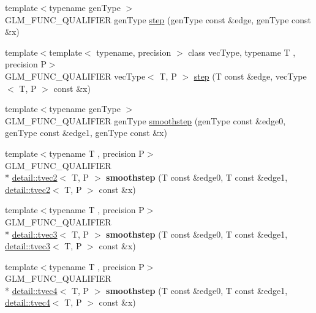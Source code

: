 \begin{DoxyCompactItemize}
\item 
{\footnotesize template$<$typename gen\-Type $>$ }\\G\-L\-M\-\_\-\-F\-U\-N\-C\-\_\-\-Q\-U\-A\-L\-I\-F\-I\-E\-R gen\-Type \hyperlink{group__core__func__common_gaf21c84759af7799f573865f70c2f0a86}{step} (gen\-Type const \&edge, gen\-Type const \&x)
\item 
{\footnotesize template$<$template$<$ typename, precision $>$ class vec\-Type, typename T , precision P$>$ }\\G\-L\-M\-\_\-\-F\-U\-N\-C\-\_\-\-Q\-U\-A\-L\-I\-F\-I\-E\-R vec\-Type$<$ T, P $>$ \hyperlink{group__core__func__common_gae830a682901c0ba63c92a7d201bba007}{step} (T const \&edge, vec\-Type$<$ T, P $>$ const \&x)
\item 
{\footnotesize template$<$typename gen\-Type $>$ }\\G\-L\-M\-\_\-\-F\-U\-N\-C\-\_\-\-Q\-U\-A\-L\-I\-F\-I\-E\-R gen\-Type \hyperlink{group__core__func__common_ga754103c8d2cdaf40f71429252457c10a}{smoothstep} (gen\-Type const \&edge0, gen\-Type const \&edge1, gen\-Type const \&x)
\item 
\hypertarget{namespaceglm_a87db22e4254b9f56eaafefb7cfb72a13}{{\footnotesize template$<$typename T , precision P$>$ }\\G\-L\-M\-\_\-\-F\-U\-N\-C\-\_\-\-Q\-U\-A\-L\-I\-F\-I\-E\-R \\*
\hyperlink{structglm_1_1detail_1_1tvec2}{detail\-::tvec2}$<$ T, P $>$ {\bfseries smoothstep} (T const \&edge0, T const \&edge1, \hyperlink{structglm_1_1detail_1_1tvec2}{detail\-::tvec2}$<$ T, P $>$ const \&x)}\label{namespaceglm_a87db22e4254b9f56eaafefb7cfb72a13}

\item 
\hypertarget{namespaceglm_a70ce610b837517f7cf8a82316b2b662c}{{\footnotesize template$<$typename T , precision P$>$ }\\G\-L\-M\-\_\-\-F\-U\-N\-C\-\_\-\-Q\-U\-A\-L\-I\-F\-I\-E\-R \\*
\hyperlink{structglm_1_1detail_1_1tvec3}{detail\-::tvec3}$<$ T, P $>$ {\bfseries smoothstep} (T const \&edge0, T const \&edge1, \hyperlink{structglm_1_1detail_1_1tvec3}{detail\-::tvec3}$<$ T, P $>$ const \&x)}\label{namespaceglm_a70ce610b837517f7cf8a82316b2b662c}

\item 
\hypertarget{namespaceglm_ab64e62cbb8d64da4f3fc8a2abaff1684}{{\footnotesize template$<$typename T , precision P$>$ }\\G\-L\-M\-\_\-\-F\-U\-N\-C\-\_\-\-Q\-U\-A\-L\-I\-F\-I\-E\-R \\*
\hyperlink{structglm_1_1detail_1_1tvec4}{detail\-::tvec4}$<$ T, P $>$ {\bfseries smoothstep} (T const \&edge0, T const \&edge1, \hyperlink{structglm_1_1detail_1_1tvec4}{detail\-::tvec4}$<$ T, P $>$ const \&x)}\label{namespaceglm_ab64e62cbb8d64da4f3fc8a2abaff1684}


\end{DoxyCompactItemize}
